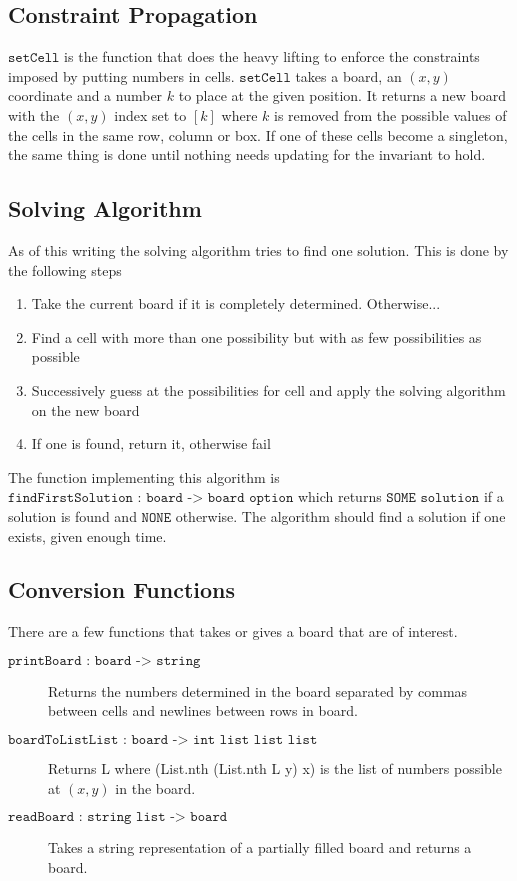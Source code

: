 \documentclass[12pt, a4paper]{article}
\begin{document}
\subsection{Constraint Propagation}

$\texttt{setCell}$ is the function that does the heavy lifting to enforce the constraints imposed by putting numbers in cells. $\texttt{setCell}$ takes a board, an $(x,y)$ coordinate and a number $k$ to place at the given position. It returns a new board with the $(x,y)$ index set to $[k]$ where $k$ is removed from the possible values of the cells in the same row, column or box. If one of these cells become a singleton, the same thing is done until nothing needs updating for the invariant to hold.

\subsection{Solving Algorithm}

As of this writing the solving algorithm tries to find one solution. This is done by the following steps
\begin{enumerate}
\item Take the current board if it is completely determined. Otherwise...
\item Find a cell with more than one possibility but with as few possibilities as possible
\item Successively guess at the possibilities for cell and
        apply the solving algorithm on the new board
\item If one is found, return it, otherwise fail
\end{enumerate}

The function implementing this algorithm is $\texttt{findFirstSolution : board -> board option}$ which returns $\texttt{SOME solution}$ if a solution is found and $\texttt{NONE}$ otherwise. The algorithm should find a solution if one exists, given enough time.

\subsection{Conversion Functions}


There are a few functions that takes or gives a board that are of interest.
\begin{description}
\item[$\texttt{printBoard : board -> string}$] Returns the numbers determined
  in the board separated by commas between cells and newlines
  between rows in board.
\item[$\texttt{boardToListList : board -> int list list list}$]
  Returns L where (List.nth (List.nth L y) x) is the list of numbers possible
  at $(x,y)$ in the board.
\item[$\texttt{readBoard : string list -> board}$]
  Takes a string representation of a partially filled board and returns a board.
\end{description}
\end{document}
